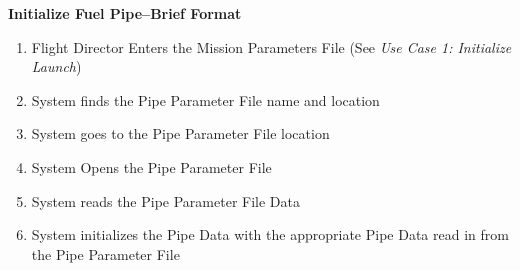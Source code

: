 \documentclass[letterpaper]{article}
\begin{document}
\noindent
\textbf{Initialize Fuel Pipe--Brief Format}
\begin{enumerate}
   \item Flight Director Enters the Mission Parameters File (See 
      \textit{Use Case 1: Initialize Launch})
   \item System finds the Pipe Parameter File name and location
   \item System goes to the Pipe Parameter File location
   \item System Opens the Pipe Parameter File
   \item System reads the Pipe Parameter File Data
   \item System initializes the Pipe Data with the appropriate Pipe 
      Data read in from the Pipe Parameter File
\end{enumerate}
\end{document}
